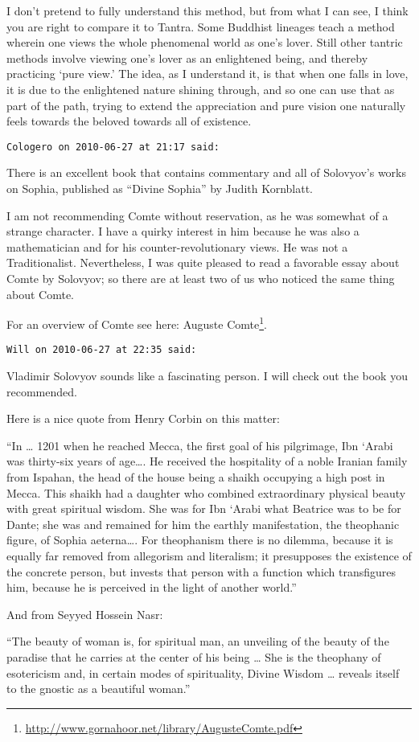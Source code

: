 \begin{footnotesize}
\begin{sffamily}
I don't pretend to fully understand this method, but from what I can see, I think you are right to compare it to Tantra. Some Buddhist lineages teach a method wherein one views the whole phenomenal world as one's lover. Still other tantric methods involve viewing one's lover as an enlightened being, and thereby practicing `pure view.' The idea, as I understand it, is that when one falls in love, it is due to the enlightened nature shining through, and so one can use that as part of the path, trying to extend the appreciation and pure vision one naturally feels towards the beloved towards all of existence.


\hfill

\texttt{Cologero on 2010-06-27 at 21:17 said: }

There is an excellent book that contains commentary and all of Solovyov's works on Sophia, published as “Divine Sophia” by Judith Kornblatt.

I am not recommending Comte without reservation, as he was somewhat of a strange character. I have a quirky interest in him because he was also a mathematician and for his counter-revolutionary views. He was not a Traditionalist. Nevertheless, I was quite pleased to read a favorable essay about Comte by Solovyov; so there are at least two of us who noticed the same thing about Comte.

For an overview of Comte see here: Auguste Comte\footnote{\url{http://www.gornahoor.net/library/AugusteComte.pdf}}.


\hfill

\texttt{Will on 2010-06-27 at 22:35 said: }

Vladimir Solovyov sounds like a fascinating person. I will check out the book you recommended.

Here is a nice quote from Henry Corbin on this matter:

“In … 1201 when he reached Mecca, the first goal of his pilgrimage, Ibn `Arabi was thirty-six years of age…. He received the hospitality of a noble Iranian family from Ispahan, the head of the house being a shaikh occupying a high post in Mecca. This shaikh had a daughter who combined extraordinary physical beauty with great spiritual wisdom. She was for Ibn `Arabi what Beatrice was to be for Dante; she was and remained for him the earthly manifestation, the theophanic figure, of Sophia aeterna…. For theophanism there is no dilemma, because it is equally far removed from allegorism and literalism; it presupposes the existence of the concrete person, but invests that person with a function which transfigures him, because he is perceived in the light of another world.”

And from Seyyed Hossein Nasr:

“The beauty of woman is, for spiritual man, an unveiling of the beauty of the paradise that he carries at the center of his being … She is the theophany of esotericism and, in certain modes of spirituality, Divine Wisdom … reveals itself to the gnostic as a beautiful woman.”


\hfill


\end{sffamily}\end{footnotesize}
